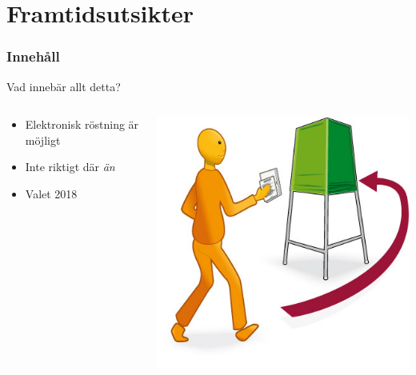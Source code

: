 \section{Framtidsutsikter}
\begin{frame}
\frametitle{Innehåll}
\tableofcontents[currentsection]
\end{frame}

\begin{frame}{Vad innebär allt detta?}



\begin{columns}
    \begin{column}{0.6\textwidth}
        \begin{itemize}
			\item Elektronisk röstning är möjligt
			\item Inte riktigt där \emph{än}
			\item Valet 2018
		\end{itemize}
    \end{column}
	\begin{column}{0.4\textwidth}
    	\includegraphics[width=\textwidth]{images/rosta.jpg}
	\end{column}
\end{columns}

\end{frame}

